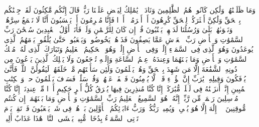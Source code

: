 \startbuffer[\q:43:76]
وَمَا ظَلَمۡنَٰهُمۡ وَلَٰكِن كَانُوا۟ هُمُ ٱلظَّٰلِمِینَ%
\stopbuffer%
\startbuffer[\q:43:77]
وَنَادَوۡا۟ یَٰمَٰلِكُ لِیَقۡضِ عَلَیۡنَا رَبُّكَۖ قَالَ إِنَّكُم مَّٰكِثُونَ%
\stopbuffer%
\startbuffer[\q:43:78]
لَقَدۡ جِئۡنَٰكُم بِٱلۡحَقِّ وَلَٰكِنَّ أَكۡثَرَكُمۡ لِلۡحَقِّ كَٰرِهُونَ%
\stopbuffer%
\startbuffer[\q:43:79]
أَمۡ أَبۡرَمُوۤا۟ أَمۡرࣰا فَإِنَّا مُبۡرِمُونَ%
\stopbuffer%
\startbuffer[\q:43:80]
أَمۡ یَحۡسَبُونَ أَنَّا لَا نَسۡمَعُ سِرَّهُمۡ وَنَجۡوَىٰهُمۚ بَلَىٰ وَرُسُلُنَا لَدَیۡهِمۡ یَكۡتُبُونَ%
\stopbuffer%
\startbuffer[\q:43:81]
قُلۡ إِن كَانَ لِلرَّحۡمَٰنِ وَلَدࣱ فَأَنَا۠ أَوَّلُ ٱلۡعَٰبِدِینَ%
\stopbuffer%
\startbuffer[\q:43:82]
سُبۡحَٰنَ رَبِّ ٱلسَّمَٰوَٰتِ وَٱلۡأَرۡضِ رَبِّ ٱلۡعَرۡشِ عَمَّا یَصِفُونَ%
\stopbuffer%
\startbuffer[\q:43:83]
فَذَرۡهُمۡ یَخُوضُوا۟ وَیَلۡعَبُوا۟ حَتَّىٰ یُلَٰقُوا۟ یَوۡمَهُمُ ٱلَّذِی یُوعَدُونَ%
\stopbuffer%
\startbuffer[\q:43:84]
وَهُوَ ٱلَّذِی فِی ٱلسَّمَاۤءِ إِلَٰهࣱ وَفِی ٱلۡأَرۡضِ إِلَٰهࣱۚ وَهُوَ ٱلۡحَكِیمُ ٱلۡعَلِیمُ%
\stopbuffer%
\startbuffer[\q:43:85]
وَتَبَارَكَ ٱلَّذِی لَهُۥ مُلۡكُ ٱلسَّمَٰوَٰتِ وَٱلۡأَرۡضِ وَمَا بَیۡنَهُمَا وَعِندَهُۥ عِلۡمُ ٱلسَّاعَةِ وَإِلَیۡهِ تُرۡجَعُونَ%
\stopbuffer%
\startbuffer[\q:43:86]
وَلَا یَمۡلِكُ ٱلَّذِینَ یَدۡعُونَ مِن دُونِهِ ٱلشَّفَٰعَةَ إِلَّا مَن شَهِدَ بِٱلۡحَقِّ وَهُمۡ یَعۡلَمُونَ%
\stopbuffer%
\startbuffer[\q:43:87]
وَلَئِن سَأَلۡتَهُم مَّنۡ خَلَقَهُمۡ لَیَقُولُنَّ ٱللَّهُۖ فَأَنَّىٰ یُؤۡفَكُونَ%
\stopbuffer%
\startbuffer[\q:43:88]
وَقِیلِهِۦ یَٰرَبِّ إِنَّ هَٰۤؤُلَاۤءِ قَوۡمࣱ لَّا یُؤۡمِنُونَ%
\stopbuffer%
\startbuffer[\q:43:89]
فَٱصۡفَحۡ عَنۡهُمۡ وَقُلۡ سَلَٰمࣱۚ فَسَوۡفَ یَعۡلَمُونَ%
\stopbuffer%
\startbuffer[\q:44:1]
حمۤ%
\stopbuffer%
\startbuffer[\q:44:2]
وَٱلۡكِتَٰبِ ٱلۡمُبِینِ%
\stopbuffer%
\startbuffer[\q:44:3]
إِنَّاۤ أَنزَلۡنَٰهُ فِی لَیۡلَةࣲ مُّبَٰرَكَةٍۚ إِنَّا كُنَّا مُنذِرِینَ%
\stopbuffer%
\startbuffer[\q:44:4]
فِیهَا یُفۡرَقُ كُلُّ أَمۡرٍ حَكِیمٍ%
\stopbuffer%
\startbuffer[\q:44:5]
أَمۡرࣰا مِّنۡ عِندِنَاۤۚ إِنَّا كُنَّا مُرۡسِلِینَ%
\stopbuffer%
\startbuffer[\q:44:6]
رَحۡمَةࣰ مِّن رَّبِّكَۚ إِنَّهُۥ هُوَ ٱلسَّمِیعُ ٱلۡعَلِیمُ%
\stopbuffer%
\startbuffer[\q:44:7]
رَبِّ ٱلسَّمَٰوَٰتِ وَٱلۡأَرۡضِ وَمَا بَیۡنَهُمَاۤۖ إِن كُنتُم مُّوقِنِینَ%
\stopbuffer%
\startbuffer[\q:44:8]
لَاۤ إِلَٰهَ إِلَّا هُوَ یُحۡیِۦ وَیُمِیتُۖ رَبُّكُمۡ وَرَبُّ ءَابَاۤئِكُمُ ٱلۡأَوَّلِینَ%
\stopbuffer%
\startbuffer[\q:44:9]
بَلۡ هُمۡ فِی شَكࣲّ یَلۡعَبُونَ%
\stopbuffer%
\startbuffer[\q:44:10]
فَٱرۡتَقِبۡ یَوۡمَ تَأۡتِی ٱلسَّمَاۤءُ بِدُخَانࣲ مُّبِینࣲ%
\stopbuffer%
\startbuffer[\q:44:11]
یَغۡشَى ٱلنَّاسَۖ هَٰذَا عَذَابٌ أَلِیمࣱ%
\stopbuffer%
\startbuffer[\q:44:12]
